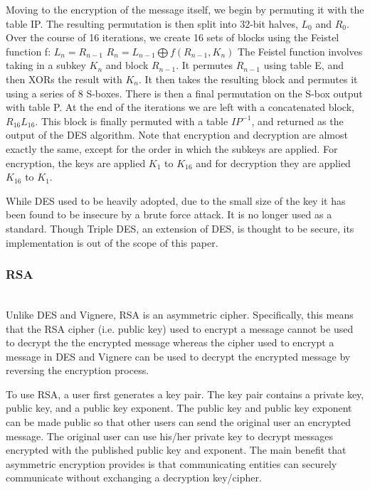 \documentclass[acmlarge]{acmart}
\begin{document}
Moving to the encryption of the message itself, we begin by permuting it with the table IP. The resulting permutation is then split into 32-bit halves, $L_{0}$ and $R_{0}$. Over the course of 16 iterations, we create 16  sets of blocks using the Feistel function f:
$L_{n} = R_{n-1}$
$R_{n} = L_{n-1} \bigoplus f(R_{n-1}, K_{n})$ 
	The Feistel function involves taking in a subkey $K_{n}$ and block $R_{n - 1}$. It permutes $R_{n - 1}$ using table E, and then XORs the result with $K_{n}$. It then takes the resulting block and permutes it using a series of 8 S-boxes. There is then a final permutation on the S-box output with table P. At the end of the iterations we are left with a concatenated block, $R_{16}L_{16}$. This block is finally permuted with a table $IP^{-1}$, and returned as the output of the DES algorithm. Note that encryption and decryption are almost exactly the same, except for the order in which the subkeys are applied. For encryption, the keys are applied $K_{1}$ to $K_{16}$ and for decryption they are applied $K_{16}$ to $K_{1}$.

While DES used to be heavily adopted, due to the small size of the key it has been found to be insecure by a brute force attack. It is no longer used as a standard. Though Triple DES, an extension of DES, is thought to be secure, its implementation is out of the scope of this paper. 

\subsubsection{RSA}
\hspace*{\fill} \\ %
Unlike DES and Vignere, RSA is an asymmetric cipher. Specifically, this means that the RSA cipher (i.e. public key) used to encrypt a message cannot be used to decrypt the the encrypted message whereas the cipher used to encrypt a message in DES and Vignere can be used to decrypt the encrypted message by reversing the encryption process.
		
To use RSA, a user first generates a key pair. The key pair contains a private key, public key, and a public key exponent. The public key and public key exponent can be made public so that other users can send the original user an encrypted message. The original user can use his/her private key to decrypt messages encrypted with the published public key and exponent. The main benefit that asymmetric encryption provides is that communicating entities can securely communicate without exchanging a decryption key/cipher.
\end{document}
